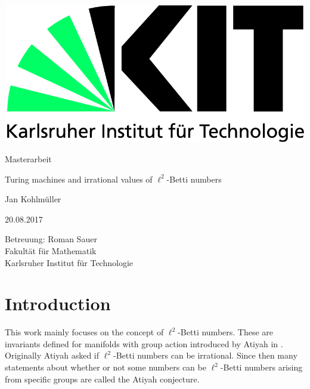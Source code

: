 \documentclass[12pt,a4paper]{scrartcl}
\theoremstyle{plain}
\theoremstyle{definition}
\newcommand{\2}{\mathbb{Z} / 2 \mathbb{Z}}
\newcommand{\1}{\bar{1}}
\newcommand{\0}{\bar{0}}
\begin{document}
  \pagestyle{empty}

  \begin{titlepage}

    \includegraphics[scale=0.45]{kit-logo.jpg} 
    \vspace*{2cm} 

 \begin{center} \large 
    
    Masterarbeit
    \vspace*{2cm}

    {\huge Turing machines and irrational values of $\ell^2$-Betti numbers}
    \vspace*{2.5cm}

    Jan Kohlmüller
    \vspace*{1.5cm}

    20.08.2017
    \vspace*{4cm}


    Betreuung: Roman Sauer \\[1cm]
    Fakultät für Mathematik \\[1cm]
		Karlsruher Institut für Technologie
  \end{center}
\end{titlepage}



  \tableofcontents

\newpage
 


  \pagestyle{headings}

\section{Introduction} 
This work mainly focuses on the concept of $\ell^2$-Betti numbers. These are invariants defined for manifolds with group action introduced by Atiyah in \cite{ATI}. Originally Atiyah asked if $\ell^2$-Betti numbers can be irrational. Since then many statements about whether or not some numbers can be $\ell^2$-Betti numbers arising from specific groups are called the Atiyah conjecture.
\end{document}
